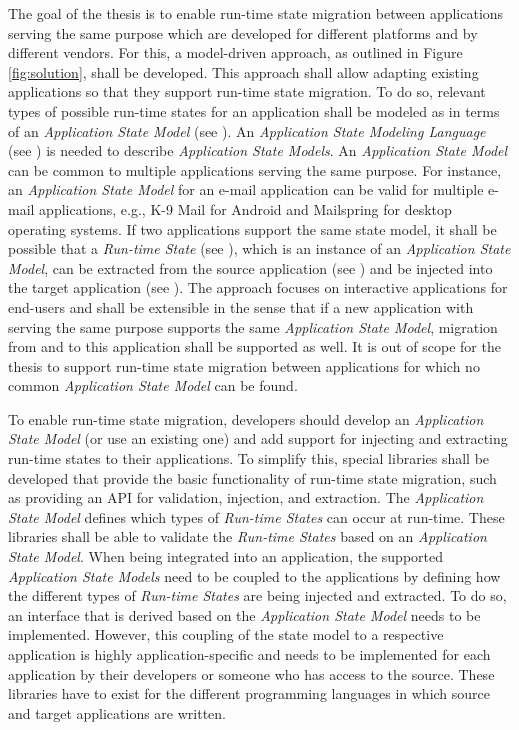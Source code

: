 The goal of the thesis is to enable run-time state migration between applications serving the same purpose which are developed for different platforms and by different vendors. 
For this, a model-driven approach, as outlined in Figure \ref{fig:solution}, shall be developed. 
This approach shall allow adapting existing applications so that they support run-time state migration.
To do so, relevant types of possible run-time states for an application shall be modeled as in terms of an \textit{Application State Model} (see \fcircone).
An \textit{Application State Modeling Language} (see \fcirctwo) is needed to describe \textit{Application State Models}.
An \textit{Application State Model} can be common to multiple applications serving the same purpose. 
For instance, an \textit{Application State Model} for an e-mail application can be valid for multiple e-mail applications, e.g., K-9 Mail for Android and Mailspring for desktop operating systems. 
If two applications support the same state model, it shall be possible that a \textit{Run-time State} (see \fcircthree), which is an instance of an \textit{Application State Model}, can be extracted from the source application (see \fcircfour) and be injected into the target application (see \fcircfive). 
The approach focuses on interactive applications for end-users and shall be extensible in the sense that if a new application with serving the same purpose supports the same \textit{Application State Model}, migration from and to this application shall be supported as well. It is out of scope for the thesis to support run-time state migration between applications for which no common \textit{Application State Model} can be found. 

To enable run-time state migration, developers should develop an \textit{Application State Model} (or use an existing one) and add support for injecting and extracting run-time states to their applications. 
To simplify this, special libraries shall be developed that provide the basic functionality of run-time state migration, such as providing an API for validation, injection, and extraction.
The \textit{Application State Model} defines which types of \textit{Run-time States} can occur at run-time.
These libraries shall be able to validate the \textit{Run-time States} based on an \textit{Application State Model}.
When being integrated into an application, the supported \textit{Application State Models} need to be coupled to the applications by defining how the different types of \textit{Run-time States} are being injected and extracted.
To do so, an interface that is derived based on the \textit{Application State Model} needs to be implemented.
However, this coupling of the state model to a respective application is highly application-specific and needs to be implemented for each application by their developers or someone who has access to the source.
These libraries have to exist for the different programming languages in which source and target applications are written. 


